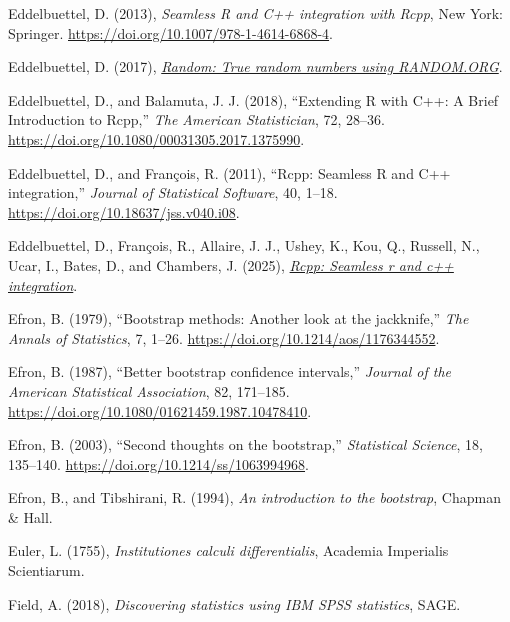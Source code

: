 \documentclass[
  10pt,
  a4paper,
  twoside]{article}
\newlength{\cslhangindent}
\newenvironment{CSLReferences}[2] %
 {\begin{list}{}{%
  \setlength{\itemindent}{0pt}
  \setlength{\leftmargin}{0pt}
  \setlength{\parsep}{0pt}
  \ifodd #1
   \setlength{\leftmargin}{\cslhangindent}
   \setlength{\itemindent}{-1\cslhangindent}
  \fi
  \setlength{\itemsep}{#2\baselineskip}}}
 {\end{list}}
\begin{document}
\begin{CSLReferences}{1}{0}
Eddelbuettel, D. (2013), \emph{Seamless {R} and {C++} integration with {Rcpp}}, New York: Springer. \url{https://doi.org/10.1007/978-1-4614-6868-4}.

Eddelbuettel, D. (2017), \emph{\href{https://CRAN.R-project.org/package=random}{Random: True random numbers using RANDOM.ORG}}.

Eddelbuettel, D., and Balamuta, J. J. (2018), {``{Extending {R} with {C++}: A Brief Introduction to {Rcpp}},''} \emph{The American Statistician}, 72, 28--36. \url{https://doi.org/10.1080/00031305.2017.1375990}.

Eddelbuettel, D., and François, R. (2011), {``{Rcpp}: Seamless {R} and {C++} integration,''} \emph{Journal of Statistical Software}, 40, 1--18. \url{https://doi.org/10.18637/jss.v040.i08}.

Eddelbuettel, D., François, R., Allaire, J. J., Ushey, K., Kou, Q., Russell, N., Ucar, I., Bates, D., and Chambers, J. (2025), \emph{\href{https://CRAN.R-project.org/package=Rcpp}{Rcpp: Seamless r and c++ integration}}.

Efron, B. (1979), {``Bootstrap methods: Another look at the jackknife,''} \emph{The Annals of Statistics}, 7, 1--26. \url{https://doi.org/10.1214/aos/1176344552}.

Efron, B. (1987), {``Better bootstrap confidence intervals,''} \emph{Journal of the American Statistical Association}, 82, 171--185. \url{https://doi.org/10.1080/01621459.1987.10478410}.

Efron, B. (2003), {``Second thoughts on the bootstrap,''} \emph{Statistical Science}, 18, 135--140. \url{https://doi.org/10.1214/ss/1063994968}.

Efron, B., and Tibshirani, R. (1994), \emph{An introduction to the bootstrap}, Chapman \& Hall.

Euler, L. (1755), \emph{Institutiones calculi differentialis}, Academia Imperialis Scientiarum.

Field, A. (2018), \emph{Discovering statistics using IBM SPSS statistics}, SAGE.


\end{CSLReferences}
\end{document}
